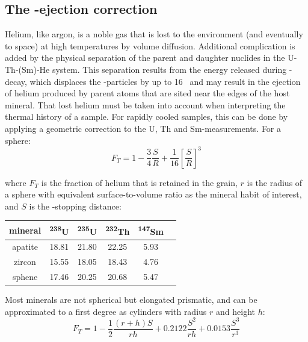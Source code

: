 \begin{refsection}
\section{The \textalpha-ejection correction}\label{sec:alpha-ejection}

Helium, like argon, is a noble gas that is lost to the environment
(and eventually to space) at high temperatures by volume diffusion.
Additional complication is added by the physical separation of the
parent and daughter nuclides in the U-Th-(Sm)-He system. This
separation results from the energy released during \textalpha-decay,
which displaces the \textalpha-particles by up to 16~ and
may result in the ejection of helium produced by parent atoms that are
sited near the edges of the host mineral. That lost helium must be
taken into account when interpreting the thermal history of a
sample. For rapidly cooled samples, this can be done by applying a
geometric correction to the U, Th and Sm-measurements. For a sphere:
\begin{equation}
  F_T = 1 - \frac{3}{4}\frac{S}{R} + \frac{1}{16} \left[\frac{S}{R}\right]^3
    \label{eq:FTsphere}
\end{equation}

\noindent where $F_T$ is the fraction of helium that is retained in
the grain, $r$ is the radius of a sphere with equivalent
surface-to-volume ratio as the mineral habit of interest, and $S$ is
the \textalpha-stopping distance:

\begin{center}
\begin{tabular}{cccccc}
  mineral & \textsuperscript{238}U & \textsuperscript{235}U
  & \textsuperscript{232}Th & \textsuperscript{147}Sm \\ \hline
  apatite & 18.81 & 21.80 & 22.25 & 5.93 \\
  zircon & 15.55 & 18.05 & 18.43 & 4.76 \\
  sphene & 17.46 & 20.25 & 20.68 & 5.47
\end{tabular}
\label{tab:stoppingdistances}
\end{center}

Most minerals are not spherical but elongated prismatic, and can be
approximated to a first degree as cylinders with radius $r$ and height
$h$:
\begin{equation}
  F_T = 1 - \frac{1}{2}\frac{(r+h)S}{rh} +
  0.2122 \frac{S^2}{rh} + 0.0153 \frac{S^3}{r^3}
  \label{eq:FTcylinder}
\end{equation}


\end{refsection}
